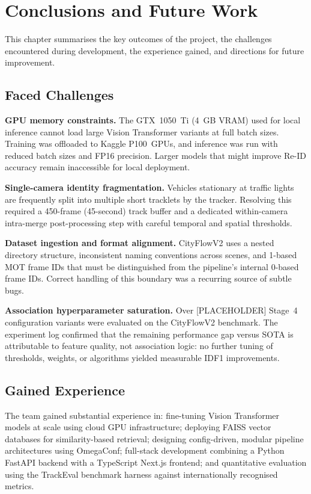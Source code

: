 \chapter{Conclusions and Future Work}

This chapter summarises the key outcomes of the project, the challenges encountered during development, the experience gained, and directions for future improvement.

\section{Faced Challenges}

\textbf{GPU memory constraints.} The GTX~1050~Ti (4~GB VRAM) used for local inference cannot load large Vision Transformer variants at full batch sizes. Training was offloaded to Kaggle P100~GPUs, and inference was run with reduced batch sizes and FP16 precision. Larger models that might improve Re-ID accuracy remain inaccessible for local deployment.

\textbf{Single-camera identity fragmentation.} Vehicles stationary at traffic lights are frequently split into multiple short tracklets by the tracker. Resolving this required a 450-frame (45-second) track buffer and a dedicated within-camera intra-merge post-processing step with careful temporal and spatial thresholds.

\textbf{Dataset ingestion and format alignment.} CityFlowV2 uses a nested directory structure, inconsistent naming conventions across scenes, and 1-based MOT frame IDs that must be distinguished from the pipeline's internal 0-based frame IDs. Correct handling of this boundary was a recurring source of subtle bugs.

\textbf{Association hyperparameter saturation.} Over [PLACEHOLDER] Stage~4 configuration variants were evaluated on the CityFlowV2 benchmark. The experiment log confirmed that the remaining performance gap versus SOTA is attributable to feature quality, not association logic: no further tuning of thresholds, weights, or algorithms yielded measurable IDF1 improvements.

\section{Gained Experience}

The team gained substantial experience in: fine-tuning Vision Transformer models at scale using cloud GPU infrastructure; deploying FAISS vector databases for similarity-based retrieval; designing config-driven, modular pipeline architectures using OmegaConf; full-stack development combining a Python FastAPI backend with a TypeScript Next.js frontend; and quantitative evaluation using the TrackEval benchmark harness against internationally recognised metrics.

